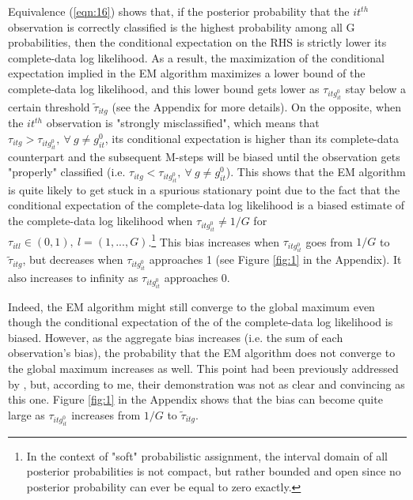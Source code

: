 \documentclass[11pt,letter]{article}
\begin{document}
Equivalence (\ref{eqn:16}) shows that, if the posterior probability that the $it^{th}$ observation is correctly classified is the highest probability among all G probabilities, then the conditional expectation on the RHS is strictly lower its complete-data log likelihood. As a result, the maximization of the conditional expectation implied in the EM algorithm maximizes a lower bound of the complete-data log likelihood, and this lower bound gets lower as $\tau_{itg^0_{it}}$ stay below a certain threshold $\tilde{\tau}_{itg}$ (see the Appendix for more details). On the opposite, when the $it^{th}$ observation is "strongly misclassified", which means that $\tau_{itg} > \tau_{itg^0_{it}}, \ \forall \ g \ne g^0_{it}$, its conditional expectation is higher than its complete-data counterpart and the subsequent M-steps will be biased until the observation gets "properly" classified (i.e. $\tau_{itg} < \tau_{itg^0_{it}}, \ \forall \ g \ne g^0_{it}$). This shows that the EM algorithm is quite likely to get stuck in a spurious stationary point due to the fact that the conditional expectation of the complete-data log likelihood is a biased estimate of the complete-data log likelihood when $\tau_{itg^0_{it}} \ne 1/G$ for $\tau_{itl} \in (0,1), \ l=(1,...,G)$.\footnote{In the context of "soft" probabilistic assignment, the interval domain of all posterior probabilities is not compact, but rather bounded and open since no posterior probability can ever be equal to zero exactly.} This bias increases when $\tau_{itg^0_{it}}$ goes from $1/G$ to $\tilde{\tau}_{itg}$, but decreases when $\tau_{itg^0_{it}}$ approaches 1 (see Figure \ref{fig:1} in the Appendix). It also increases to infinity as $\tau_{itg^0_{it}}$ approaches 0.
\par
Indeed, the EM algorithm might still converge to the global maximum even though the conditional expectation of the of the complete-data log likelihood is biased. However, as the aggregate bias increases (i.e. the sum of each observation's bias), the probability that the EM algorithm does not converge to the global maximum increases as well. This point had been previously addressed by \cite{gepperth_gradient-based_2021}, but, according to me, their demonstration was not as clear and convincing as this one. Figure \ref{fig:1} in the Appendix shows that the bias can become quite large as $\tau_{itg^0_{it}}$ increases from $1/G$ to $\tilde{\tau}_{itg}$.
\par
\end{document}
